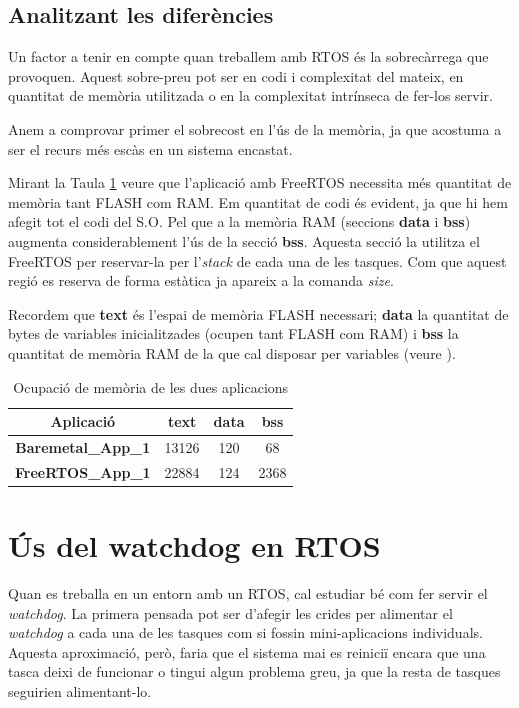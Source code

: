 \section{Analitzant les diferències}
Un factor a tenir en compte quan treballem amb \gls{RTOS} és la sobrecàrrega que provoquen. Aquest sobre-preu pot ser en codi i complexitat del mateix, en quantitat de memòria utilitzada o en la complexitat intrínseca de fer-los servir.

Anem a comprovar primer el sobrecost en l'ús de la memòria, ja que acostuma a ser el recurs més escàs en un sistema encastat.

Mirant la Taula \ref{tb:bin_size} veure que l'aplicació amb FreeRTOS necessita més quantitat de memòria tant FLASH com RAM. Em quantitat de codi és evident, ja que hi hem afegit tot el codi del S.O. Pel que a la memòria RAM (seccions {\bf data} i {\bf bss}) augmenta considerablement l'ús de la secció {\bf bss}. Aquesta secció la utilitza el FreeRTOS per reservar-la per l'{\em stack} de cada una de les tasques. Com que aquest regió es reserva de forma estàtica ja apareix a la comanda {\em size}.

\begin{remark}
 Recordem que {\bf text} és l'espai de memòria FLASH necessari; {\bf data} la quantitat de bytes de variables inicialitzades (ocupen tant FLASH com RAM) i {\bf bss} la quantitat de memòria RAM de la que cal disposar per variables (veure ).
\end{remark}


\begin{table}[!htbp]
\caption{Ocupació de memòria de les dues aplicacions}
\centering
\begin{tabular}{|c|c|c|c|}
\hline
{\bf Aplicació} & {\bf text} & {\bf data} & {\bf bss}\\
\hline
{\bf Baremetal\_App\_1} & 13126 & 120 & 68\\
\hline
{\bf FreeRTOS\_App\_1} & 22884 & 124 & 2368\\
\hline
\end{tabular}
\label{tb:bin_size}
\end{table}


\chapter{Ús del {\bf watchdog} en RTOS}
Quan es treballa en un entorn amb un RTOS, cal estudiar bé com fer servir el {\em watchdog}. La primera pensada pot ser d'afegir les crides per alimentar el {\em watchdog} a cada una de les tasques com si fossin mini-aplicacions individuals. Aquesta aproximació, però, faria que el sistema mai es reiniciï encara que una tasca deixi de funcionar o tingui algun problema greu, ja que la resta de tasques seguirien alimentant-lo.

